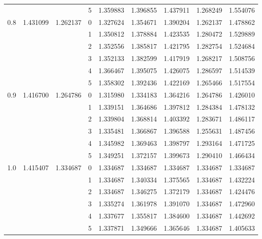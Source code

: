 \begin{tabular}{llllrrrrr}
    &          &          & 5 &  1.359883 &  1.396855 &  1.437911 &  1.268249 &  1.554076 \\
0.8 & 1.431099 & 1.262137 & 0 &  1.327624 &  1.354671 &  1.390204 &  1.262137 &  1.478862 \\
    &          &          & 1 &  1.350812 &  1.378884 &  1.423535 &  1.280472 &  1.529889 \\
    &          &          & 2 &  1.352556 &  1.385817 &  1.421795 &  1.282754 &  1.524684 \\
    &          &          & 3 &  1.352133 &  1.382599 &  1.417919 &  1.268217 &  1.508756 \\
    &          &          & 4 &  1.366467 &  1.395075 &  1.426075 &  1.286597 &  1.514539 \\
    &          &          & 5 &  1.358302 &  1.392436 &  1.422169 &  1.265466 &  1.517554 \\
0.9 & 1.416700 & 1.264786 & 0 &  1.315980 &  1.334183 &  1.364216 &  1.264786 &  1.426010 \\
    &          &          & 1 &  1.339151 &  1.364686 &  1.397812 &  1.284384 &  1.478132 \\
    &          &          & 2 &  1.339804 &  1.368814 &  1.403392 &  1.283671 &  1.486117 \\
    &          &          & 3 &  1.335481 &  1.366867 &  1.396588 &  1.255631 &  1.487456 \\
    &          &          & 4 &  1.345982 &  1.369463 &  1.398797 &  1.293164 &  1.471725 \\
    &          &          & 5 &  1.349251 &  1.372157 &  1.399673 &  1.290410 &  1.466434 \\
1.0 & 1.415407 & 1.334687 & 0 &  1.334687 &  1.334687 &  1.334687 &  1.334687 &  1.334687 \\
    &          &          & 1 &  1.334687 &  1.340334 &  1.375565 &  1.334687 &  1.432224 \\
    &          &          & 2 &  1.334687 &  1.346275 &  1.372179 &  1.334687 &  1.424476 \\
    &          &          & 3 &  1.335274 &  1.361978 &  1.391070 &  1.334687 &  1.472960 \\
    &          &          & 4 &  1.337677 &  1.355817 &  1.384600 &  1.334687 &  1.442692 \\
    &          &          & 5 &  1.337871 &  1.349666 &  1.365646 &  1.334687 &  1.405633 \\
\bottomrule
\end{tabular}
